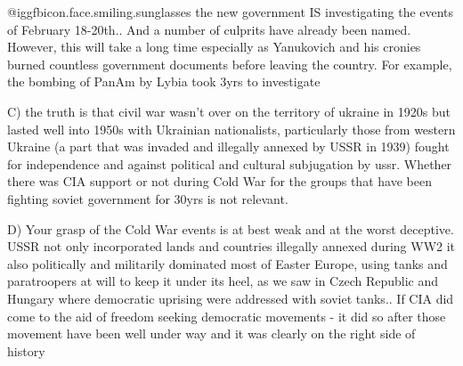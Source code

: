 \begin{itemize}
@igg{fbicon.face.smiling.sunglasses}  the new government IS investigating the
events of February 18-20th.. And a number of culprits have already been named.
However, this will take a long time especially as Yanukovich and his cronies
burned countless government documents before leaving the country. For example,
the bombing of PanAm by Lybia took 3yrs to investigate

C) the truth is that civil war wasn't over on the territory of ukraine in 1920s
but lasted well into 1950s with Ukrainian nationalists, particularly those from
western Ukraine (a part that was invaded and illegally annexed by USSR in 1939)
fought for independence and against political and cultural subjugation by ussr.
Whether there was CIA support or not during Cold War for the groups that have
been fighting soviet government for 30yrs is not relevant.

D) Your grasp of the Cold War events is at best weak and at the worst
deceptive. USSR not only incorporated lands and countries illegally annexed
during WW2 it also politically and militarily dominated most of Easter Europe,
using tanks and paratroopers at will to keep it under its heel, as we saw in
Czech Republic and Hungary where democratic uprising were addressed with soviet
tanks.. If CIA did come to the aid of freedom seeking democratic movements - it
did so after those movement have been well under way and it was clearly on the
right side of history



\end{itemize} %
